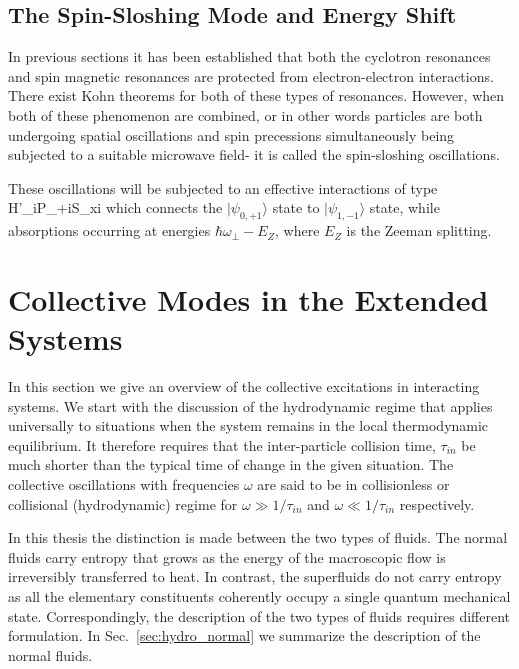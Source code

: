\subsection{The Spin-Sloshing Mode and Energy Shift}
In previous sections it has been established that both the cyclotron resonances and spin magnetic resonances are protected from electron-electron interactions. There exist Kohn theorems for both of these types of resonances. However, when both of these phenomenon are combined, or in other words particles are both undergoing spatial oscillations and spin precessions simultaneously being subjected to a suitable microwave field- it is called the spin-sloshing oscillations.

These oscillations will be subjected to an effective interactions of type
\be
H'\propto \sum_i{P_{+i}S_{xi}}
\ee
which connects the $|\psi_{0,+1}\rangle$ state to $|\psi_{1,-1}\rangle$ state, while absorptions occurring at energies $\hbar\omega_{\perp}- E_Z$, where $E_Z$ is the Zeeman splitting.


\section{Collective Modes in the Extended Systems}
In this section we give an overview of the collective excitations in interacting systems.
We start with the discussion of the hydrodynamic regime that applies universally to situations when the system remains in the local thermodynamic equilibrium.
It therefore requires that the inter-particle collision time, $\tau_{in}$ be much shorter than the typical time of change in the given situation.
The collective oscillations with frequencies $\omega$ are said to be in collisionless or collisional (hydrodynamic) regime for 
$\omega \gg 1/\tau_{in}$ and  $\omega \ll 1/\tau_{in}$ respectively.

In this thesis the distinction is made between the two types of fluids.
The normal fluids carry entropy that grows  as the  energy of the macroscopic flow is irreversibly transferred to heat.
In contrast, the superfluids do not carry entropy as all the elementary constituents coherently occupy a single quantum  mechanical state. 
Correspondingly, the description of the two types of fluids requires different formulation.
In Sec.~\ref{sec:hydro_normal} we summarize the description of the normal fluids.

